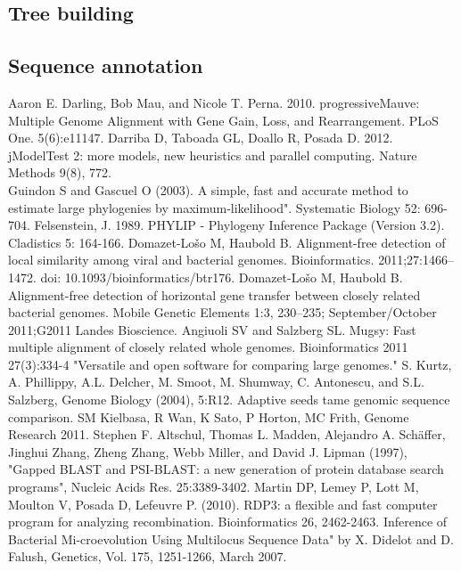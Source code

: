 \documentclass[12pt]{article}
\begin{document}
\subsection{Tree building}

\subsection{Sequence annotation}

\newpage
\begin{thebibliography}{9}
Aaron E. Darling, Bob Mau, and Nicole T. Perna. 2010.  progressiveMauve: Multiple Genome Alignment with Gene Gain, Loss, and Rearrangement.  PLoS One.  5(6):e11147.
Darriba D, Taboada GL, Doallo R, Posada D. 2012. jModelTest 2: more models, new heuristics and parallel computing. Nature Methods 9(8), 772.\\
Guindon S and Gascuel O (2003). A simple, fast and accurate method to estimate large phylogenies by maximum-likelihood". Systematic Biology 52: 696-704.
Felsenstein, J. 1989. PHYLIP - Phylogeny Inference Package (Version 3.2). Cladistics 5: 164-166.
Domazet-Lošo M, Haubold B. Alignment-free detection of local similarity among viral and bacterial genomes. Bioinformatics. 2011;27:1466–1472. doi: 10.1093/bioinformatics/btr176.
Domazet-Lošo M, Haubold B. Alignment-free detection of horizontal gene transfer between closely related bacterial genomes. Mobile Genetic Elements 1:3, 230–235; September/October 2011;G2011 Landes Bioscience.
Angiuoli SV and Salzberg SL. Mugsy: Fast multiple alignment of closely related whole genomes. Bioinformatics 2011 27(3):334-4
"Versatile and open software for comparing large genomes." S. Kurtz, A. Phillippy, A.L. Delcher, M. Smoot, M. Shumway, C. Antonescu, and S.L. Salzberg, Genome Biology (2004), 5:R12.
Adaptive seeds tame genomic sequence comparison. SM Kielbasa, R Wan, K Sato, P Horton, MC Frith, Genome Research 2011.
Stephen F. Altschul, Thomas L. Madden, Alejandro A. Schäffer, Jinghui Zhang, Zheng Zhang, Webb Miller, and David J. Lipman (1997), "Gapped BLAST and PSI-BLAST: a new generation of protein database search programs", Nucleic Acids Res. 25:3389-3402.
Martin DP, Lemey P, Lott M, Moulton V, Posada D, Lefeuvre P. (2010). RDP3: a flexible and fast computer program for analyzing recombination. Bioinformatics 26, 2462-2463.
Inference of Bacterial Mi-croevolution Using Multilocus Sequence Data" by X. Didelot and D. Falush, Genetics, Vol. 175,
1251-1266, March 2007.
\end{thebibliography}
\end{document}
